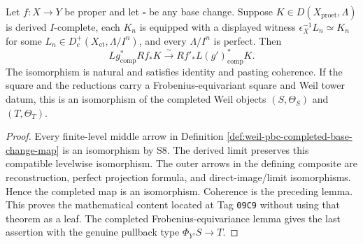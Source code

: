 \begin{proposition}
\label{prop:weil-proet-complete-proper-base-change}
Let $f:X\to Y$ be proper and let $\square$ be any base change.  Suppose
$K\in D(X_{\mathrm{proet}},\Lambda)$ is derived $I$-complete, each $K_n$ is
equipped with a displayed witness
$\epsilon_X^{-1}L_n\simeq K_n$ for some
$L_n\in D_c^+(X_{\mathrm{et}},\Lambda/I^n)$, and every $\Lambda/I^n$ is
perfect.  Then
\[
 Lg^*_{\mathrm{comp}}Rf_*K\xrightarrow{\sim}
 Rf'_*L(g')^*_{\mathrm{comp}}K.
\]
The isomorphism is natural and satisfies identity and pasting coherence.  If
the square and the reductions carry a Frobenius-equivariant square and Weil
tower datum, this is an isomorphism of the completed Weil objects
$(S,\Theta_S)$ and $(T,\Theta_T)$.
\end{proposition}
\begin{proof}

Every finite-level middle arrow in Definition
\ref{def:weil-pbc-completed-base-change-map} is an isomorphism by S8.  The
derived limit preserves this compatible levelwise isomorphism.  The outer
arrows in the defining composite are reconstruction, perfect projection
formula, and direct-image/limit isomorphisms.  Hence the completed map is an
isomorphism.  Coherence is the preceding lemma.  This proves the mathematical
content located at Tag \texttt{09C9} without using that theorem as a leaf.
The completed Frobenius-equivariance lemma gives the last assertion with the
genuine pullback type $\Phi_{Y'}S\to T$.
\end{proof}

